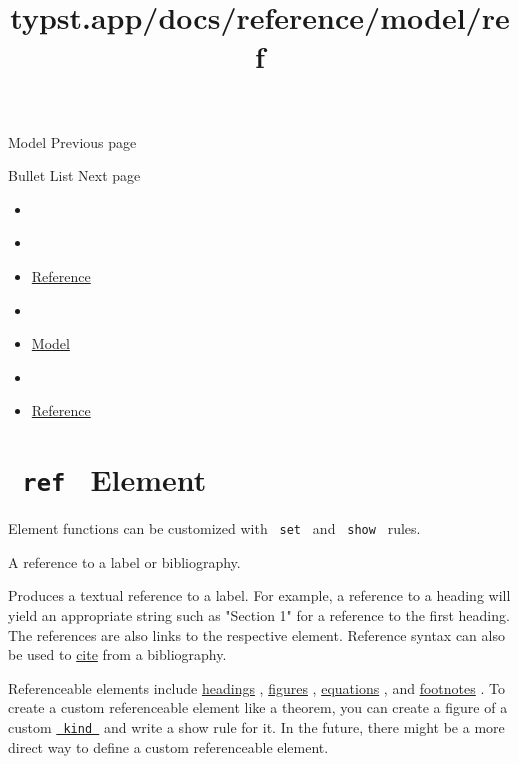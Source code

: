 { Model } { Previous page }

\href{/docs/reference/model/list/}{\pandocbounded{}}

{ Bullet List } { Next page }


\title{typst.app/docs/reference/model/ref}

\begin{itemize}
\tightlist
\item
  \href{/docs}{}
\item
  
\item
  \href{/docs/reference/}{Reference}
\item
  
\item
  \href{/docs/reference/model/}{Model}
\item
  
\item
  \href{/docs/reference/model/ref/}{Reference}
\end{itemize}

\section{\texorpdfstring{\texttt{\ ref\ } {{ Element
}}}{ ref   Element }}\label{summary}

\label{element-tooltip}
Element functions can be customized with \texttt{\ set\ } and
\texttt{\ show\ } rules.

A reference to a label or bibliography.

Produces a textual reference to a label. For example, a reference to a
heading will yield an appropriate string such as "Section 1" for a
reference to the first heading. The references are also links to the
respective element. Reference syntax can also be used to
\href{/docs/reference/model/cite/}{cite} from a bibliography.

Referenceable elements include
\href{/docs/reference/model/heading/}{headings} ,
\href{/docs/reference/model/figure/}{figures} ,
\href{/docs/reference/math/equation/}{equations} , and
\href{/docs/reference/model/footnote/}{footnotes} . To create a custom
referenceable element like a theorem, you can create a figure of a
custom
\href{/docs/reference/model/figure/\#parameters-kind}{\texttt{\ kind\ }}
and write a show rule for it. In the future, there might be a more
direct way to define a custom referenceable element.

